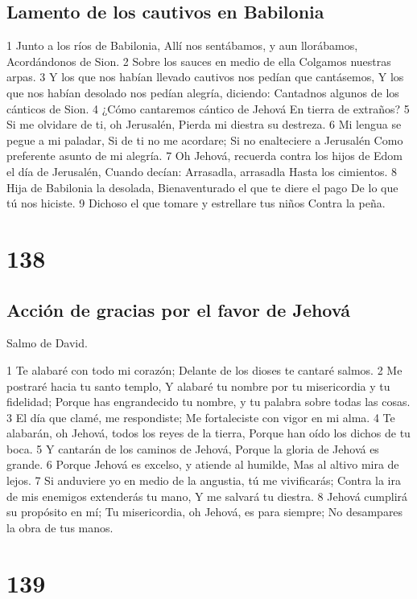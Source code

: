 \section*{Lamento de los cautivos en Babilonia}

1 Junto a los ríos de Babilonia,
Allí nos sentábamos, y aun llorábamos,
Acordándonos de Sion.
2 Sobre los sauces en medio de ella
Colgamos nuestras arpas.
3 Y los que nos habían llevado cautivos nos pedían que cantásemos,
Y los que nos habían desolado nos pedían alegría, diciendo:
Cantadnos algunos de los cánticos de Sion.
4 ¿Cómo cantaremos cántico de Jehová
En tierra de extraños?
5 Si me olvidare de ti, oh Jerusalén,
Pierda mi diestra su destreza.
6 Mi lengua se pegue a mi paladar,
Si de ti no me acordare;
Si no enalteciere a Jerusalén
Como preferente asunto de mi alegría.
7 Oh Jehová, recuerda contra los hijos de Edom el día de Jerusalén,
Cuando decían: Arrasadla, arrasadla
Hasta los cimientos.
8 Hija de Babilonia la desolada,
Bienaventurado el que te diere el pago
De lo que tú nos hiciste.
9 Dichoso el que tomare y estrellare tus niños
Contra la peña.

\chapter{138}

\section*{Acción de gracias por el favor de Jehová}

Salmo de David.

1 Te alabaré con todo mi corazón;
Delante de los dioses te cantaré salmos.
2 Me postraré hacia tu santo templo,
Y alabaré tu nombre por tu misericordia y tu fidelidad;
Porque has engrandecido tu nombre, y tu palabra sobre todas las cosas.
3 El día que clamé, me respondiste;
Me fortaleciste con vigor en mi alma.
4 Te alabarán, oh Jehová, todos los reyes de la tierra,
Porque han oído los dichos de tu boca.
5 Y cantarán de los caminos de Jehová,
Porque la gloria de Jehová es grande.
6 Porque Jehová es excelso, y atiende al humilde,
Mas al altivo mira de lejos.
7 Si anduviere yo en medio de la angustia, tú me vivificarás;
Contra la ira de mis enemigos extenderás tu mano,
Y me salvará tu diestra.
8 Jehová cumplirá su propósito en mí;
Tu misericordia, oh Jehová, es para siempre;
No desampares la obra de tus manos.

\chapter{139}

